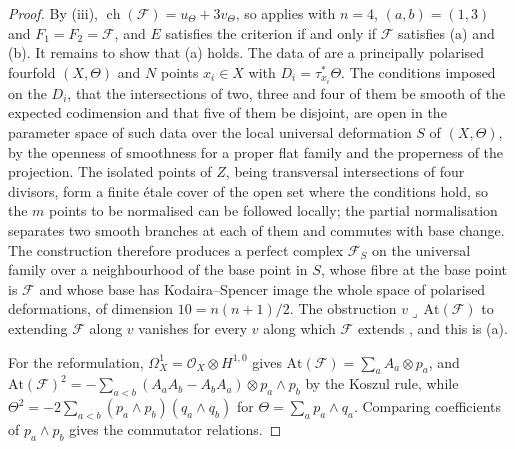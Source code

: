 \documentclass[11pt,reqno]{amsart}
\theoremstyle{plain}
\theoremstyle{definition}
\theoremstyle{remark}
\newcommand{\cF}{\mathcal{F}}
\newcommand{\cO}{\mathcal{O}}
\DeclareMathOperator{\ch}{ch}
\begin{document}
\begin{proof}
By (iii), $\ch(\cF)=u_{\Theta}+3v_{\Theta}$, so
 applies with $n=4$, $(a,b)=(1,3)$ and $F_{1}=F_{2}=\cF$, and
$E$ satisfies the criterion if and only if $\cF$ satisfies (a) and (b). It
remains to show that (a) holds. The data of  are a
principally polarised fourfold $(X,\Theta)$ and $N$ points $x_{i}\in X$ with
$D_{i}=\tau_{x_{i}}^{*}\Theta$. The conditions imposed on the $D_{i}$, that
the intersections of two, three and four of them be smooth of the expected
codimension and that five of them be disjoint, are open in the parameter
space of such data over the local universal deformation $S$ of $(X,\Theta)$,
by the openness of smoothness for a proper flat family and the properness of
the projection. The isolated points of $Z$, being transversal intersections
of four divisors, form a finite \'etale cover of the open set where the
conditions hold, so the $m$ points to be normalised can be followed locally;
the partial normalisation separates two smooth branches at each of them and
commutes with base change. The construction therefore produces a perfect
complex $\cF_{S}$ on the universal family over a neighbourhood of the base
point in $S$, whose fibre at the base point is $\cF$ and whose base has
Kodaira--Spencer image the whole space of polarised deformations, of
dimension $10=n(n+1)/2$. The obstruction $v\lrcorner\,\mathrm{At}(\cF)$ to
extending $\cF$ along $v$ vanishes for every $v$ along which $\cF$ extends
\cite{Tod09}, and this is (a).

For the reformulation, $\Omega^{1}_{X}=\cO_{X}\otimes H^{1,0}$ gives
$\mathrm{At}(\cF)=\sum_{a}A_{a}\otimes p_{a}$, and
$\mathrm{At}(\cF)^{2}=-\sum_{a<b}(A_{a}A_{b}-A_{b}A_{a})\otimes p_{a}\wedge p_{b}$
by the Koszul rule, while $\Theta^{2}=-2\sum_{a<b}(p_{a}\wedge p_{b})(q_{a}\wedge q_{b})$
for $\Theta=\sum_{a}p_{a}\wedge q_{a}$. Comparing coefficients of
$p_{a}\wedge p_{b}$ gives the commutator relations.
\end{proof}
\end{document}
